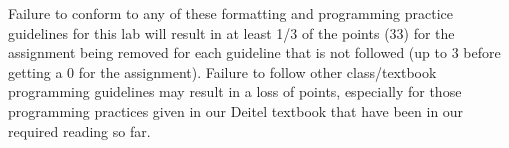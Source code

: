 \documentclass[11pt]{article}
\begin{document}
Failure to conform to any of these formatting and programming practice
guidelines for this lab will result in at least 1/3 of the points (33)
for the assignment being removed for each guideline that is not
followed (up to 3 before getting a 0 for the assignment). Failure to
follow other class/textbook programming guidelines may result in a
loss of points, especially for those programming practices given in
our Deitel textbook that have been in our required reading so far.
\end{document}
